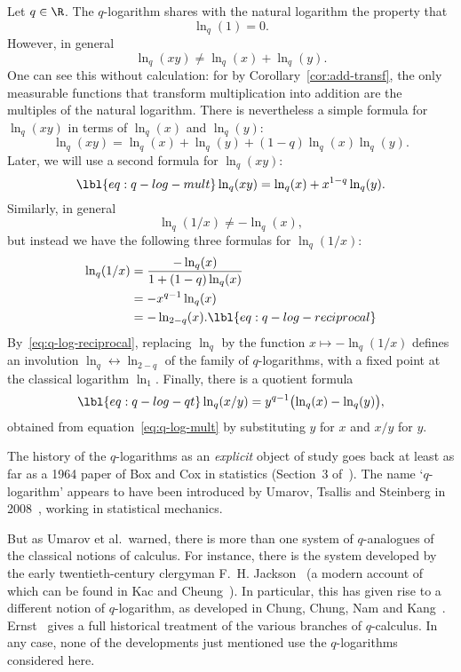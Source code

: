 Let $q \in \R$.  The $q$-logarithm shares with the natural logarithm the
property that 
\[
\ln_q(1) = 0.
\]
However, in general
\[
\ln_q(xy) \neq \ln_q(x) + \ln_q(y).
\]
One can see this without calculation: for by
Corollary~\ref{cor:add-transf}, the only
measurable functions that transform multiplication into addition are the
multiples of the natural logarithm.  There is nevertheless a simple formula
for $\ln_q(xy)$ in terms of $\ln_q(x)$ and $\ln_q(y)$:
\[
\ln_q(xy)
=
\ln_q(x) + \ln_q(y) + (1 - q)\ln_q(x)\ln_q(y).
\]
Later, we will use a second formula for $\ln_q(xy)$:
% 
\begin{equation}
\lbl{eq:q-log-mult}
\ln_q(xy)
=
\ln_q(x) + x^{1 - q} \ln_q(y).
\end{equation}
% 
Similarly, in general
\[
\ln_q(1/x) \neq -\ln_q(x),
\]
but instead we have the following three formulas for $\ln_q(1/x)$:
% 
\begin{align}
\ln_q(1/x)      &
=
\frac{-\ln_q(x)}{1 + (1 - q)\ln_q(x)}
\nonumber       \\
&
=
-x^{q - 1} \ln_q(x)    
\nonumber       \\
&
=
-\ln_{2 - q}(x).
\lbl{eq:q-log-reciprocal}
\end{align}
% 
By~\eqref{eq:q-log-reciprocal}, replacing $\ln_q$ by the function $x
\mapsto -\ln_q(1/x)$ defines an involution $\ln_q \leftrightarrow \ln_{2 -
  q}$ of the family of $q$-logarithms, with a fixed point at the classical
logarithm $\ln_1$.  Finally, there is a quotient formula
% 
\begin{equation}
\lbl{eq:q-log-qt}
\ln_q(x/y) 
=
y^{q - 1} \bigl(\ln_q(x) - \ln_q(y)\bigr),
\end{equation}
% 
obtained from equation~\eqref{eq:q-log-mult} by substituting $y$ for $x$
and $x/y$ for $y$.

\begin{remark}
% 
The history of the $q$-logarithms as an \emph{explicit} object of study
goes back at least as far as a 1964 paper of Box and Cox in statistics
(Section~3 of~\cite{BoCo}).  The name `$q$-logarithm' appears to have been
introduced by Umarov, Tsallis and Steinberg in 2008~\cite{UTS}, working in
statistical mechanics.  

But as Umarov et al.\ warned, there is more than one system of
$q$-analogues of the classical notions of calculus.  For instance, there
is the system developed by the early twentieth-century clergyman
F.~H. Jackson~\cite{JackQFC} (a modern account of which can be found in Kac
and Cheung~\cite{KaCh}).  In particular, this has given rise to a different
notion of $q$-logarithm, as developed in Chung, Chung, Nam and
Kang~\cite{CCNK}.  Ernst~\cite{Erns} gives a full historical treatment of
the various branches of $q$-calculus.  In any case, none of the
developments just mentioned use the $q$-logarithms considered here.
% 
% 
\end{remark}


